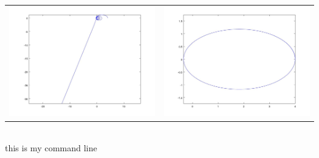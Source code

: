 \documentclass[12pt]{article}
\theoremstyle{homework}
\begin{document}
\begin{enumerate}[(a)]
\begin{tabular}{c c}
\includegraphics[scale=.3]{../octave/f8.jpg} & \includegraphics[scale=.3]{../octave/f9.jpg}
\end{tabular}\\
this is my command line

\end{enumerate}
\end{document}
